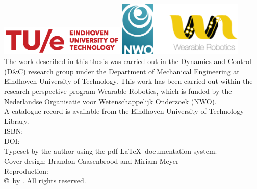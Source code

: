 \thispagestyle{empty}
\vspace*{30mm}\noindent
\begin{center}
{\LARGE\sf\maintitle}\\[4.5cm] %
{\Large\sf \@author}
\end{center}

\newpage
\thispagestyle{empty}

\vspace*{\fill}

\hspace*{-7mm}\includegraphics[width=6cm]{./img/TUeLOG_new.eps} \hspace*{1mm}\includegraphics[width=6cm]{./img/NWO_WR.png}\\[2mm]
%
{\small The work described in this thesis was carried out in the Dynamics and Control (D\&C) research group under the Department of Mechanical Engineering at Eindhoven University of Technology. This work has been carried out within the research perspective program Wearable Robotics, which is funded by the Nederlandse Organisatie voor Wetenschappelijk Onderzoek (NWO). } \\[.5mm]


\noindent\bgroup\small
A catalogue record is available from the Eindhoven University of Technology Library.\\
ISBN: \isbn \\
DOI: \doi
\\[4mm]
Typeset by the author using the pdf \LaTeX \ documentation system.\\
Cover design: Brandon Caasenbrood and Miriam Meyer \\
Reproduction: \printer\\[8mm]
\copyright\year\, by \@author. All rights reserved.
\egroup

\newpage

